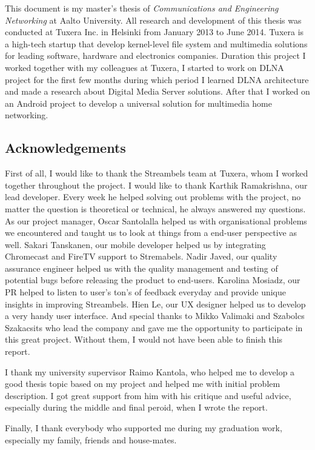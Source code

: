 
This document is my master's thesis of \textit{Communications and Engineering
Networking} at Aalto University. All research and development of this thesis was
conducted at Tuxera Inc. in Helsinki from January 2013 to June 2014. Tuxera is a
high-tech startup that develop kernel-level file system and multimedia solutions
for leading software, hardware and electronics companies.
Duration this project I worked together with my colleagues at Tuxera, I started
to work on DLNA project for the first few months during which period I learned
DLNA architecture and made a research about Digital Media Server solutions.
After that I worked on an Android project to develop a universal solution for
multimedia home networking.

\subsection*{Acknowledgements}
First of all, I would like to thank the Streambels team at Tuxera, whom I worked
together throughout the project. I would like to thank Karthik Ramakrishna, our
lead developer. Every week he helped solving out problems with the project,
no matter the question is theoretical or technical, he always answered my
questions. As our project manager, Oscar Santolalla helped us with
organisational problems we encountered and taught us to look at things from a
end-user perspective as well. Sakari Tanskanen, our mobile developer helped us by
integrating Chromecast and FireTV support to Stremabels. Nadir Javed, our
quality assurance engineer helped us with the quality management and testing of
potential bugs before releasing the product to end-users. Karolina Mosiadz, our
PR helped to listen to user's ton's of feedback everyday and provide unique
insights in improving Streambels. Hien Le, our UX designer helped us to develop
a very handy user interface. And special thanks to Mikko Valimaki and Szabolcs
Szakacsits who lead the company and gave me the opportunity to participate in
this great project. Without them, I would not have been able to finish this
report.

I thank my university supervisor Raimo Kantola, who helped me to develop a good
thesis topic based on my project and helped me with initial problem description.
I got great support from him with his critique and useful advice, especially
during the middle and final peroid, when I wrote the report.

Finally, I thank everybody who supported me during my graduation work,
especially my family, friends and house-mates.
